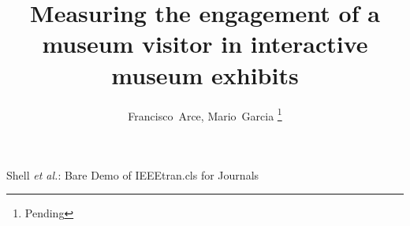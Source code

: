 \documentclass[journal]{IEEEtran}
\begin{document}
\title{Measuring the engagement of a museum visitor in interactive museum exhibits}
%

\author{Francisco~Arce,
        Mario~Garcia
\thanks{Pending}%
}

% 
%



%
{Shell \MakeLowercase{\textit{et al.}}: Bare Demo of IEEEtran.cls for Journals}
% 











\maketitle
\end{document}
